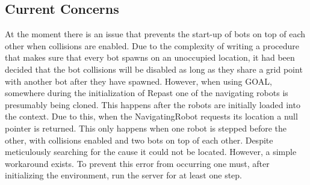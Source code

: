 \subsection{Current Concerns}
At the moment there is an issue that prevents the start-up of bots on top of each other when collisions are enabled. Due to the complexity of writing a procedure that makes sure that every bot spawns on an unoccupied location, it had been decided that the bot collisions will be disabled as long as they share a grid point with another bot after they have spawned. 
However, when using GOAL, somewhere during the initialization of Repast one of the navigating robots is presumably being cloned. This happens after the robots are initially loaded into the context. Due to this, when the NavigatingRobot requests its location a null pointer is returned. This only happens when one robot is stepped before the other, with collisions enabled and two bots on top of each other. Despite meticulously searching for the cause it could not be located. However, a simple workaround exists. To prevent this error from occurring one must, after initializing the environment, run the server for at least one step.
